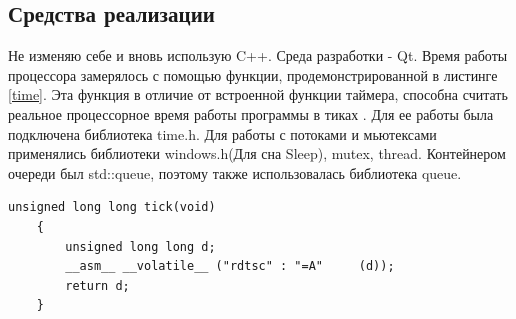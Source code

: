 \documentclass[a4paper, 14pt]{article}
\begin{document}
	\subsection{Средства реализации}
	\hspace{1cm}Не изменяю себе и вновь использую C++.
	Среда разработки - Qt.
	Время работы процессора замерялось с помощью функции, продемонстрированной в листинге \ref{time}. Эта функция в отличие от встроенной функции таймера, способна считать реальное процессорное время работы программы в тиках \cite{lom}. Для ее работы была подключена библиотека time.h. Для работы с потоками и мьютексами применялись библиотеки windows.h(Для сна Sleep), mutex, thread. Контейнером очереди был std::queue, поэтому также использовалась библиотека queue.
	\begin{lstlisting}[label=time,caption=Функция замера процессороного времени]
    unsigned long long tick(void)
    {
        unsigned long long d;
        __asm__ __volatile__ ("rdtsc" : "=A"     (d));
        return d;
    }
	\end{lstlisting}
\end{document}
